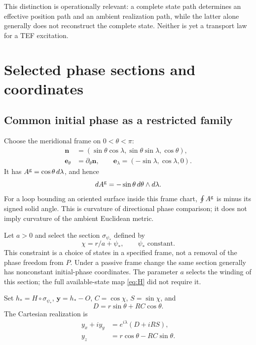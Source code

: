 \documentclass[11pt]{article}
\newcommand{\n}{\bm n}
\newcommand{\et}{\bm e_\theta}
\newcommand{\el}{\bm e_\lambda}
\newcommand{\Ag}{A^{\rm g}}
\begin{document}
This distinction is operationally relevant: a complete state path determines an effective position path and an ambient realization path, while the latter alone generally does not reconstruct the complete state. Neither is yet a transport law for a TEF excitation.

\section{Selected phase sections and coordinates}
\label{sec:coordinates}

\subsection{Common initial phase as a restricted family}

Choose the meridional frame on $0<\theta<\pi$:
\begin{equation}
 \begin{aligned}
 \n&=(\sin\theta\cos\lambda,\sin\theta\sin\lambda,\cos\theta),\\
 \et&=\partial_\theta\n,
 \qquad\el=(-\sin\lambda,\cos\lambda,0).
 \end{aligned}
\end{equation}
It has $\Ag=\cos\theta\,d\lambda$, and hence
\begin{equation}
 d\Ag=-\sin\theta\,d\theta\wedge d\lambda.
 \label{eq:angularcurvature}
\end{equation}
For a loop bounding an oriented surface inside this frame chart, $\oint\Ag$ is minus its signed solid angle. This is curvature of directional phase comparison; it does not imply curvature of the ambient Euclidean metric.

Let $a>0$ and select the section $\sigma_{\psi_*}$ defined by
\begin{equation}
 \chi=r/a+\psi_*,\qquad\psi_*\text{ constant}.
 \label{eq:section}
\end{equation}
This constraint is a choice of states in a specified frame, not a removal of the phase freedom from $P$. Under a passive frame change the same section generally has nonconstant initial-phase coordinates. The parameter $a$ selects the winding of this section; the full available-state map \eqref{eq:H} did not require it.

Set $h_*=H\circ\sigma_{\psi_*}$, $\bm y=h_*-O$, $C=\cos\chi$, $S=\sin\chi$, and
\begin{equation}
 D=r\sin\theta+RC\cos\theta.
\end{equation}
The Cartesian realization is
\begin{equation}
 \begin{aligned}
 y_x+i y_y&=e^{i\lambda}(D+iRS),\\
 y_z&=r\cos\theta-RC\sin\theta.
 \end{aligned}
 \label{eq:cartesian}
\end{equation}
\end{document}
